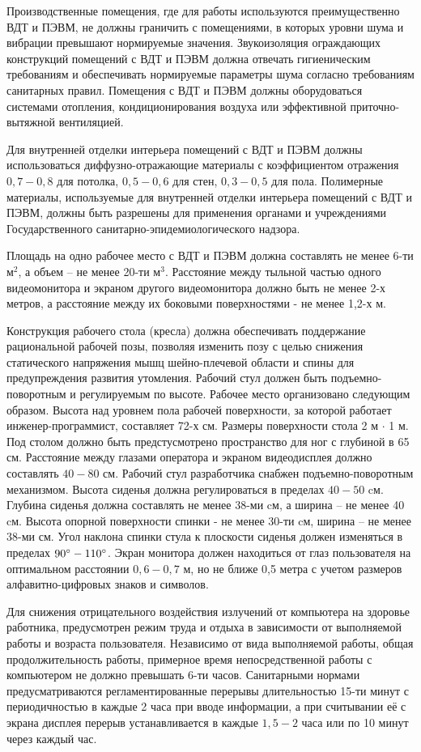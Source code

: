 Производственные помещения, где для работы используются преимущественно ВДТ и
ПЭВМ, не должны граничить с помещениями, в которых уровни шума и вибрации превышают
нормируемые значения. Звукоизоляция ограждающих конструкций помещений с ВДТ и ПЭВМ
должна отвечать гигиеническим требованиям и обеспечивать нормируемые параметры шума
согласно требованиям санитарных правил. Помещения с ВДТ и ПЭВМ должны оборудоваться
системами отопления, кондиционирования воздуха или эффективной приточно-вытяжной
вентиляцией.

Для внутренней отделки интерьера помещений с ВДТ и ПЭВМ должны использоваться
диффузно-отражающие материалы с коэффициентом отражения $0,7 - 0,8$ для потолка,
$0,5 - 0,6$ для стен, $0,3 - 0,5$ для пола. Полимерные материалы, используемые для
внутренней отделки интерьера помещений с ВДТ и ПЭВМ, должны быть разрешены для
применения органами и учреждениями Государственного санитарно-эпидемиологического
надзора.

Площадь на одно рабочее место с ВДТ и ПЭВМ должна составлять не менее 6-ти $\text{м}^2$,
а объем – не менее 20-ти $\text{м}^3$. Расстояние между тыльной частью одного
видеомонитора и экраном другого видеомонитора должно быть не менее 2-х метров, а
расстояние между их боковыми поверхностями - не менее 1,2-х м.

Конструкция рабочего стола (кресла) должна обеспечивать поддержание рациональной
рабочей позы, позволяя изменить позу с целью снижения статического напряжения мышц
шейно-плечевой области и спины для предупреждения развития утомления. Рабочий стул
должен быть подъемно-поворотным и регулируемым по высоте. Рабочее место организовано
следующим образом. Высота над уровнем пола рабочей поверхности, за которой работает
инженер-программист, составляет 72-х см. Размеры поверхности стола
2 м $\cdot$ 1 м. Под столом должно быть предстусмотрено пространство
для ног с глубиной в 65 см. Расстояние между глазами оператора и
экраном видеодисплея должно
составлять $40 - 80$ см. Рабочий стул разработчика снабжен подъемно-поворотным
механизмом. Высота сиденья должна регулироваться в пределах $40 - 50$ cм. Глубина
сиденья должна составлять не менее 38-ми cм, а ширина – не менее 40 cм. Высота
опорной поверхности спинки - не менее 30-ти cм, ширина – не менее 38-ми см. Угол наклона
спинки стула к плоскости сиденья должен изменяться в пределах $90 \degree - 110 \degree$.
Экран монитора должен находиться от глаз пользователя на оптимальном
расстоянии $0,6 - 0,7$ м, но не ближе 0,5 метра с учетом размеров алфавитно-цифровых
знаков и символов.

Для снижения отрицательного воздействия излучений от компьютера
на здоровье работника, предусмотрен режим труда и отдыха в зависимости от выполняемой
работы и возраста пользователя. Независимо от вида выполняемой работы, общая
продолжительность работы, примерное время непосредственной работы с компьютером
не должно превышать 6-ти часов. Санитарными нормами предусматриваются регламентированные
перерывы длительностью 15-ти минут с периодичностью в каждые 2 часа при вводе
информации, а при считывании её с экрана дисплея перерыв устанавливается в
каждые $1,5 - 2$ часа или по 10 минут через каждый час.
